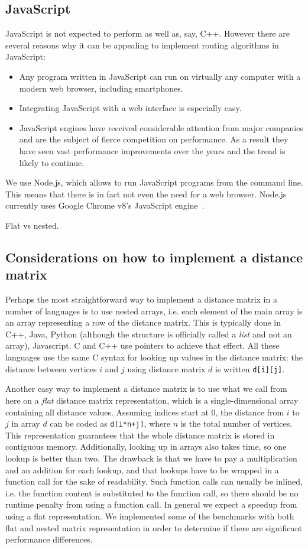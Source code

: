 \documentclass[11pt,a4paper,notitlepage]{article}
\begin{document}
\subsection{JavaScript}
JavaScript is not expected to perform as well as, say, C++. However
there are several reasons why it can be appealing to implement routing
algorithms in JavaScript:
\begin{itemize}
\item Any program written in JavaScript can run on virtually any
  computer with a modern web browser, including smartphones.
\item Integrating JavaScript with a web interface is especially easy.
\item JavaScript engines have received considerable attention from
  major companies and are the subject of fierce competition on
  performance. As a result they have seen vast performance
  improvements over the years and the trend is likely to continue.
\end{itemize}

We use Node.js, which allows to run JavaScript programs from the
command line. This means that there is in fact not even the need for a
web browser. Node.js currently uses Google Chrome v8's JavaScript
engine~\cite{nodejs}.

Flat vs nested.

\subsection{Considerations on how to implement a distance matrix}
Perhaps the most straightforward way to implement a distance matrix in
a number of languages is to use nested arrays, i.e. each element of the
main array is an array representing a row of the distance matrix. This
is typically done in C++, Java, Python (although the structure is
officially called a \emph{list} and not an array), Javascript. C and
C++ use pointers to achieve that effect. All these languages use the
same C syntax for looking up values in the distance matrix: the
distance between vertices $i$ and $j$ using distance matrix $d$ is
written \lstinline{d[i][j]}.

Another easy way to implement a distance matrix is to use what we
call from here on a \emph{flat} distance matrix representation, which
is a single-dimensional array containing all distance values. Assuming
indices start at 0, the distance from $i$ to $j$ in array $d$ can be
coded as \lstinline{d[i*n+j]}, where $n$ is the total number of
vertices. This representation guarantees that the whole distance
matrix is stored in contiguous memory. Additionally, looking up in
arrays also takes time, so one lookup is better than two. The drawback
is that we have to pay a multiplication and an addition for each
lookup, and that lookups have to be wrapped in a function call for the
sake of readability. Such function calls can usually be inlined,
i.e. the function content is substituted to the function call, so
there should be no runtime penalty from using a function call. In
general we expect a speedup from using a flat representation. We
implemented some of the benchmarks with both flat and nested matrix
representation in order to determine if there are significant
performance differences.
\end{document}

